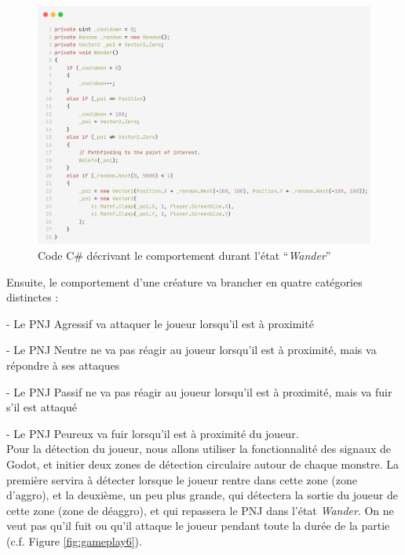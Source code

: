 \begin{figure}[H]
    \centering
    \includegraphics[width=1.0\textwidth]{2.game/assets/gameplay5.png}
    \caption{Code C\# décrivant le comportement durant l'état “\textit{Wander}”}
    \label{fig:gameplay5}
\end{figure}

Ensuite, le comportement d'une créature va brancher en quatre catégories distinctes :

- Le PNJ Agressif va attaquer le joueur lorsqu'il est à proximité

- Le PNJ Neutre ne va pas réagir au joueur lorsqu'il est à proximité, mais va répondre à ses attaques

- Le PNJ Passif ne va pas réagir au joueur lorsqu'il est à proximité, mais va fuir s'il est attaqué

- Le PNJ Peureux va fuir lorsqu'il est à proximité du joueur.
\\

Pour la détection du joueur, nous allons utiliser la fonctionnalité des signaux de Godot, et initier deux zones de détection circulaire autour de chaque monstre.
La première servira à détecter lorsque le joueur rentre dans cette zone (zone d'aggro), et la deuxième, un peu plus grande, qui détectera la sortie du joueur de cette zone (zone de déaggro), et qui repassera le PNJ dans l'état \textit{Wander}.
On ne veut pas qu'il fuit ou qu'il attaque le joueur pendant toute la durée de la partie (c.f. Figure \ref*{fig:gameplay6}).

